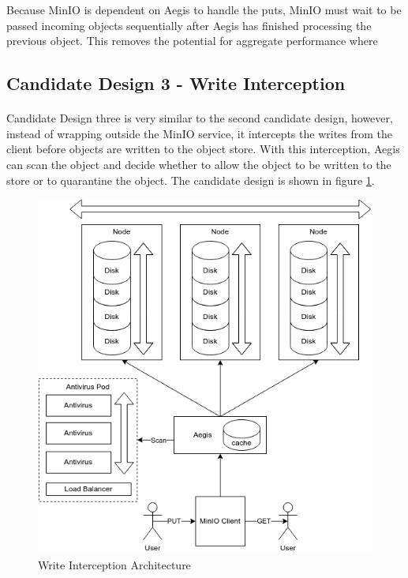\documentclass[12pt, conference, final, a4paper, onecolumn, compsoc]{IEEEtran}
\begin{document}

Because MinIO is dependent on Aegis to handle the puts, MinIO must wait to be
passed incoming objects sequentially after Aegis has finished processing the
previous object. This removes the potential for aggregate performance where


\subsection*{Candidate Design 3 - Write Interception}
\paragraph{}


Candidate Design three is very similar to the second candidate design, however,
instead of wrapping outside the MinIO service, it intercepts the writes from the
client before objects are written to the object store. With this interception,
Aegis can scan the object and decide whether to allow the object to be written
to the store or to quarantine the object. The candidate design is shown in
figure \ref{fig:writeInterceptArch}.

\begin{figure}
  \centering \includegraphics[scale=.3]{diagrams/write-intercept.png}
  \caption{Write Interception Architecture}
  \label{fig:writeInterceptArch}
\end{figure}
\end{document}
